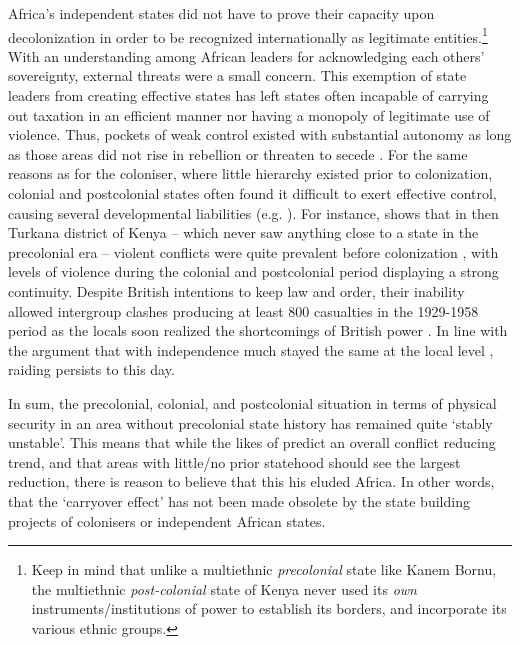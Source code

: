 Africa's independent states did not have to prove their capacity upon
decolonization in order to be recognized internationally as legitimate
entities.\footnote{Keep in mind that unlike a multiethnic \textit{precolonial}
	state like Kanem Bornu, the multiethnic \textit{post-colonial} state of
Kenya never used its \textit{own} instruments/institutions of power to establish
its borders, and incorporate its various ethnic groups.} With an understanding
among African leaders for acknowledging each others' sovereignty, external
threats were a small concern. This exemption of state leaders from creating
effective states \citep{Jackson_1982} has left states often incapable of
carrying out taxation in an efficient manner nor having a monopoly of legitimate
use of violence. Thus, pockets of weak control existed with substantial autonomy
as long as those areas did not rise in rebellion or threaten to secede
\citep[47]{englebert2013inside}. For the same reasons as for the coloniser,
where little hierarchy existed prior to colonization, colonial and postcolonial
states often found it difficult to exert effective control, causing several
developmental liabilities (e.g. \citet{Michalopoulos2013}). For instance,
\citet[8ff]{oba1992ecological} shows that in then Turkana district of Kenya --
which never saw anything close to a state in the precolonial era -- violent
conflicts were quite prevalent before colonization
\citep{muller1989transforming}, with levels of violence during the colonial and
postcolonial period displaying a strong continuity. Despite British intentions
to keep law and order, their inability allowed intergroup clashes producing at
least 800 casualties in the 1929-1958 period as the locals soon realized the
shortcomings of British power \citep[8]{oba1992ecological}. In line with the
argument that with independence much stayed the same at the local level
\citep{englebert2013inside}, raiding persists to this day. 


In sum, the precolonial, colonial, and postcolonial situation in terms of
physical security in an area without precolonial state history has remained
quite `stably unstable'. This means that while the likes of \citet{Pinker2012}
predict an overall conflict reducing trend, and that areas with little/no prior
statehood should see the largest reduction, there is reason to believe that this
his eluded Africa. In other words, that the `carryover effect' has not been made
obsolete by the state building projects of colonisers or independent African
states.

